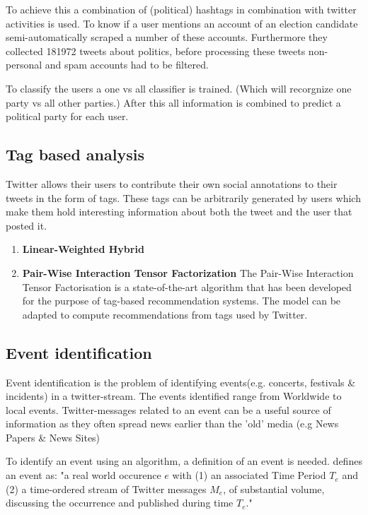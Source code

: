 \documentclass{article}
\begin{document}
To achieve this a combination of (political) hashtags in combination with twitter activities is used. To know if a user mentions an account of an election candidate \cite{pol} semi-automatically scraped a number of these accounts. Furthermore they collected 181972 tweets about politics, before processing these tweets non-personal and spam accounts had to be filtered.

To classify the users a one vs all classifier is trained. (Which will recorgnize one party vs all other parties.) After this all information is combined to predict a political party for each user. 
\subsection{Tag based analysis}

Twitter allows their users to contribute their own social annotations to their tweets in the form of tags. These tags can be arbitrarily generated by users 
which make them hold interesting information about both the tweet and the user that posted it.

\begin{enumerate}
\item \textbf{Linear-Weighted Hybrid}\\


\item \textbf{Pair-Wise Interaction Tensor Factorization} The Pair-Wise Interaction Tensor Factorisation is a state-of-the-art algorithm that has
been developed for the purpose of tag-based recommendation systems. The model can be adapted to compute recommendations from tags used by Twitter.
	
\end{enumerate}


\subsection{Event identification}

Event identification is the problem of identifying events(e.g. concerts, festivals \& incidents) in a twitter-stream. The events identified range from Worldwide to local events. Twitter-messages related to an event can be a useful source of information as they often spread news earlier than the 'old' media (e.g News Papers \& News Sites)

To identify an event using an algorithm, a definition of an event is needed. \cite{eventident} defines an event as: "a real world occurence $e$ with (1) an associated Time Period $T_e$ and (2) a time-ordered stream of Twitter messages $M_e$, of substantial volume, discussing the
occurrence and published during time $T_e$."
\end{document}

